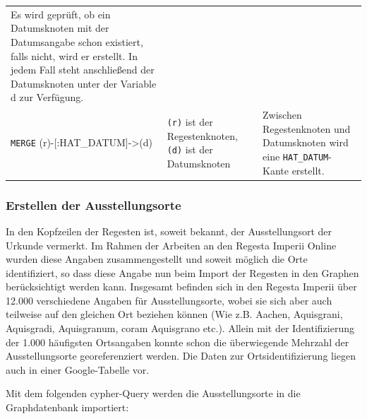 \documentclass[12pt,ngerman,]{article}
\begin{document}
\begin{longtable}[]{@{}lll@{}}
\begin{minipage}[t]{0.37\columnwidth}
Es wird geprüft, ob ein Datumsknoten mit der Datumsangabe schon
existiert, falls nicht, wird er erstellt. In jedem Fall steht
anschließend der Datumsknoten unter der Variable d zur Verfügung.\strut
\end{minipage}\tabularnewline
\begin{minipage}[t]{0.31\columnwidth}\raggedright\strut
\texttt{MERGE} (r)-{[}:HAT\_DATUM{]}-\textgreater{}(d)\strut
\end{minipage} & \begin{minipage}[t]{0.23\columnwidth}\raggedright\strut
\texttt{(r)} ist der Regestenknoten, \texttt{(d)} ist der
Datumsknoten\strut
\end{minipage} & \begin{minipage}[t]{0.37\columnwidth}\raggedright\strut
Zwischen Regestenknoten und Datumsknoten wird eine
\texttt{HAT\_DATUM}-Kante erstellt.\strut
\end{minipage}\tabularnewline
\bottomrule
\end{longtable}

\subsubsection{Erstellen der
Ausstellungsorte}\label{erstellen-der-ausstellungsorte}

In den Kopfzeilen der Regesten ist, soweit bekannt, der Ausstellungsort
der Urkunde vermerkt. Im Rahmen der Arbeiten an den Regesta Imperii
Online wurden diese Angaben zusammengestellt und soweit möglich die Orte
identifiziert, so dass diese Angabe nun beim Import der Regesten in den
Graphen berücksichtigt werden kann. Insgesamt befinden sich in den
Regesta Imperii über 12.000 verschiedene Angaben für Ausstellungsorte,
wobei sie sich aber auch teilweise auf den gleichen Ort beziehen können
(Wie z.B. Aachen, Aquisgrani, Aquisgradi, Aquisgranum, coram Aquisgrano
etc.). Allein mit der Identifizierung der 1.000 häufigsten Ortsangaben
konnte schon die überwiegende Mehrzahl der Ausstellungsorte
georeferenziert werden. Die Daten zur Ortsidentifizierung liegen auch in
einer Google-Tabelle vor.

Mit dem folgenden cypher-Query werden die Ausstellungsorte in die
Graphdatenbank importiert:
\end{document}
